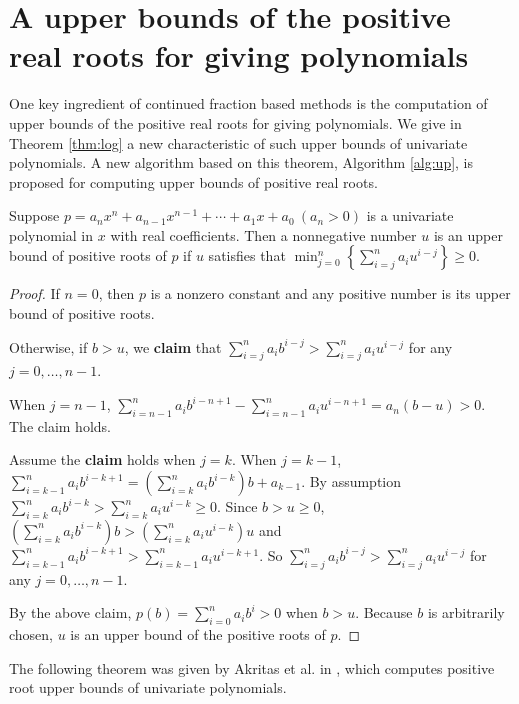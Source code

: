 
\section{A  upper bounds of the positive real roots for giving  polynomials}
\label{sec:thm}

One key ingredient of continued fraction based methods is the computation of upper bounds of the positive real roots for giving  polynomials. We give in Theorem \ref{thm:log} a new characteristic of such upper bounds of univariate polynomials. A new algorithm based on this theorem, Algorithm \ref{alg:up}, is proposed for computing upper bounds of positive real roots.


\begin{theorem} \label{thm:log}
  Suppose   $p=a_nx^n+a_{n-1}x^{n-1}+\cdots+a_1x+a_0\ (a_n>0)$  is a univariate polynomial in $x$ with real coefficients.  Then  a nonnegative number $u$ is an upper bound of positive roots of $p$ if $u$   satisfies that $\min_{j=0}^{n}\left\{  \sum_{i=j}^n a_i u^{i-j}\right\}\ge0$.
\end{theorem}
\begin{proof}
  If $n=0$, then $p$ is a nonzero constant and any positive number is its upper bound of positive roots.

  Otherwise, if $b>u$,  we {\bf claim} that $\sum_{i=j}^na_ib^{i-j}> \sum_{i=j}^na_iu^{i-j}$ for any $j= 0,\ldots,n-1$.

  When $j=n-1$, $\sum_{i=n-1}^na_ib^{i-n+1}-\sum_{i=n-1}^na_iu^{i-n+1}=a_n(b-u)>0.$ The claim holds.

  Assume the {\bf claim} holds  when $j=k$. When $j=k-1$,  $\sum_{i=k-1}^na_ib^{i-k+1}=\left(\sum_{i=k}^na_ib^{i-k}\right)b+a_{k-1} $. By assumption
  $\sum_{i=k}^na_ib^{i-k}>\sum_{i=k}^na_iu^{i-k}\ge0$. Since $b>u\ge0$, $\left(\sum_{i=k}^na_ib^{i-k}\right)b>\left (\sum_{i=k}^na_iu^{i-k} \right)u  $
  and $\sum_{i=k-1}^na_ib^{i-k+1}> \sum_{i=k-1}^na_iu^{i-k+1}$. So  $\sum_{i=j}^na_ib^{i-j}> \sum_{i=j}^na_iu^{i-j}$ for any $j= 0,\ldots,n-1$.


  By the above claim,   $p(b)=\sum_{i=0}^na_ib^i>0$ when  $b>u$. Because $b$ is arbitrarily chosen, $u$ is an upper bound of the positive roots of $p$.

\end{proof}


The following theorem was given by Akritas et al. in  \cite{akr08}, which computes positive root upper bounds of univariate polynomials.

